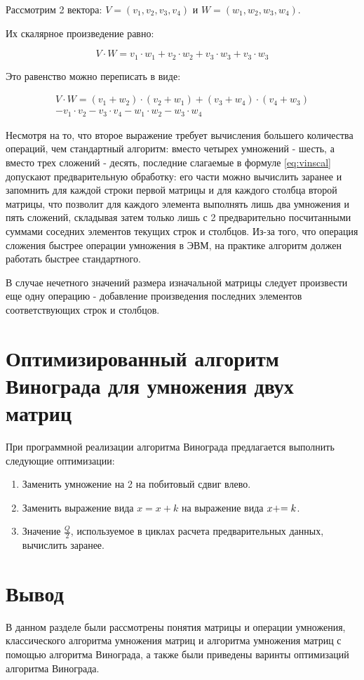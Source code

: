 Рассмотрим 2 вектора: $V = (v_1, v_2, v_3, v_4)$ и $W = (w_1, w_2, w_3, w_4)$.

Их скалярное произведение равно:

\begin{equation}
	\label{eq:vimul}
	V \cdot W = v_1 \cdot w_1 + v_2 \cdot w_2 + v_3 \cdot w_3 + v_3 \cdot w_3
\end{equation}

\clearpage

Это равенство можно переписать в виде:

\begin{equation}
	\label{eq:vinscal}
	\begin{gathered} 
		V \cdot W = (v_1 + w_2) \cdot (v_2 + w_1) + (v_3 + w_4) \cdot (v_4 + w_3) \\
		- v_1 \cdot v_2 - v_3 \cdot v_4 - w_1 \cdot w_2 - w_3 \cdot w_4
	\end{gathered}
\end{equation}


Несмотря на то, что второе выражение требует вычисления большего количества операций, чем стандартный алгоритм: вместо четырех умножений - шесть, а вместо трех сложений - десять, последние слагаемые в формуле \ref{eq:vinscal} допускают предварительную обработку: его части можно вычислить заранее и запомнить для каждой строки первой матрицы и для каждого столбца второй матрицы, что позволит для каждого элемента выполнять лишь два умножения и пять сложений, складывая затем только лишь с 2 предварительно посчитанными суммами соседних элементов текущих строк и столбцов. Из-за того, что операция сложения быстрее операции умножения в ЭВМ, на практике алгоритм должен работать быстрее стандартного.

В случае нечетного значений размера изначальной матрицы следует произвести еще одну операцию - добавление произведения последних элементов соответствующих строк и столбцов.

\section{Оптимизированный алгоритм Винограда для умножения двух матриц}

При программной реализации алгоритма Винограда предлагается выполнить следующие оптимизации: 

\begin{enumerate}[label={\arabic*)}]
	\item Заменить умножение на 2 на побитовый сдвиг влево.
	\item Заменить выражение вида $x = x + k$ на выражение вида $x +\kern-0.25em= k$.
	\item Значение $\frac{Q}{2}$, используемое в циклах расчета предварительных данных, вычислить заранее.
\end{enumerate}

\clearpage

\section*{Вывод}

В данном разделе были рассмотрены понятия матрицы и операции умножения, классического алгоритма умножения матриц и алгоритма умножения матриц с помощью алгоритма Винограда, а также были приведены варинты оптимизаций алгоритма Винограда.
